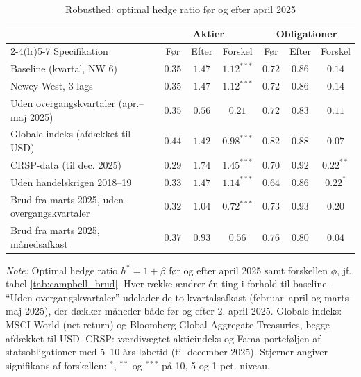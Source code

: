 \begin{table}[H]
\centering
\caption{Robusthed: optimal hedge ratio før og efter april 2025}
\label{tab:campbell_rob}
\begin{threeparttable}
\begin{tabular}{l ccc ccc}
\toprule
 & \multicolumn{3}{c}{Aktier} & \multicolumn{3}{c}{Obligationer} \\
\cmidrule(lr){2-4}\cmidrule(lr){5-7}
Specifikation & Før & Efter & Forskel & Før & Efter & Forskel \\
\midrule
Baseline (kvartal, NW 6) & $0.35$ & $1.47$ & $1.12^{***}$ & $0.72$ & $0.86$ & $0.14$ \\
Newey-West, 3 lags & $0.35$ & $1.47$ & $1.12^{***}$ & $0.72$ & $0.86$ & $0.14$ \\
Uden overgangskvartaler (apr.--maj 2025) & $0.35$ & $0.56$ & $0.21$ & $0.72$ & $0.83$ & $0.11$ \\
Globale indeks (afdækket til USD) & $0.44$ & $1.42$ & $0.98^{***}$ & $0.82$ & $0.88$ & $0.07$ \\
CRSP-data (til dec. 2025) & $0.29$ & $1.74$ & $1.45^{***}$ & $0.70$ & $0.92$ & $0.22^{**}$ \\
Uden handelskrigen 2018--19 & $0.33$ & $1.47$ & $1.14^{***}$ & $0.64$ & $0.86$ & $0.22^{*}$ \\
Brud fra marts 2025, uden overgangskvartaler & $0.32$ & $1.04$ & $0.72^{***}$ & $0.73$ & $0.93$ & $0.20$ \\
Brud fra marts 2025, månedsafkast & $0.37$ & $0.93$ & $0.56$ & $0.76$ & $0.80$ & $0.04$ \\
\bottomrule
\end{tabular}
\begin{tablenotes}[flushleft]\footnotesize
\item \textit{Note:} Optimal hedge ratio $h^* = 1+\beta$ før og efter april 2025 samt forskellen $\phi$,
jf. tabel \ref{tab:campbell_brud}. Hver række ændrer én ting i forhold til baseline. ``Uden overgangskvartaler''
udelader de to kvartalsafkast (februar--april og marts--maj 2025), der dækker måneder både før og efter
2. april 2025.
Globale indeks: MSCI World (net return) og Bloomberg Global Aggregate Treasuries, begge afdækket til USD.
CRSP: værdivægtet aktieindeks og Fama-porteføljen af statsobligationer med 5--10 års løbetid (til december 2025).
Stjerner angiver signifikans af forskellen: $^{*}$, $^{**}$ og $^{***}$ på 10, 5 og 1 pct.-niveau.
\end{tablenotes}
\end{threeparttable}
\end{table}